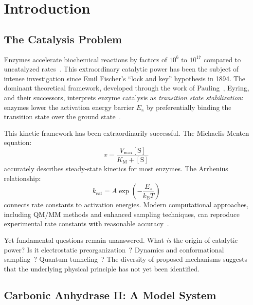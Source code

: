 \documentclass[twocolumn,amsmath,amssymb,aps,prb,superscriptaddress,longbibliography]{revtex4-2}
\newcommand{\kcat}{k_{\mathrm{cat}}}
\newcommand{\kB}{k_{\mathrm{B}}}
\newcommand{\Km}{K_{\mathrm{M}}}
\newcommand{\Vmax}{V_{\mathrm{max}}}
\newcommand{\Ea}{E_{\mathrm{a}}}
\begin{document}
\section{Introduction}
\label{sec:intro}

\subsection{The Catalysis Problem}

Enzymes accelerate biochemical reactions by factors of $10^{6}$ to $10^{17}$ compared to uncatalyzed rates~\cite{Wolfenden1999}. This extraordinary catalytic power has been the subject of intense investigation since Emil Fischer's ``lock and key'' hypothesis in 1894. The dominant theoretical framework, developed through the work of Pauling~\cite{Pauling1946}, Eyring, and their successors, interprets enzyme catalysis as \emph{transition state stabilization}: enzymes lower the activation energy barrier $\Ea$ by preferentially binding the transition state over the ground state~\cite{Fersht1999}.

This kinetic framework has been extraordinarily successful. The Michaelis-Menten equation:
\begin{equation}
v = \frac{\Vmax [\text{S}]}{\Km + [\text{S}]}
\label{eq:michaelis-menten}
\end{equation}
accurately describes steady-state kinetics for most enzymes. The Arrhenius relationship:
\begin{equation}
\kcat = A \exp\left(-\frac{\Ea}{\kB T}\right)
\label{eq:arrhenius}
\end{equation}
connects rate constants to activation energies. Modern computational approaches, including QM/MM methods and enhanced sampling techniques, can reproduce experimental rate constants with reasonable accuracy~\cite{Warshel1998, Garcia-Viloca2004, Kamerlin2010}.

Yet fundamental questions remain unanswered. What \emph{is} the origin of catalytic power? Is it electrostatic preorganization~\cite{Warshel1998}? Dynamics and conformational sampling~\cite{Kamerlin2010, Kohen2015}? Quantum tunneling~\cite{Nagel2006}? The diversity of proposed mechanisms suggests that the underlying physical principle has not yet been identified.

\subsection{Carbonic Anhydrase II: A Model System}
\end{document}
